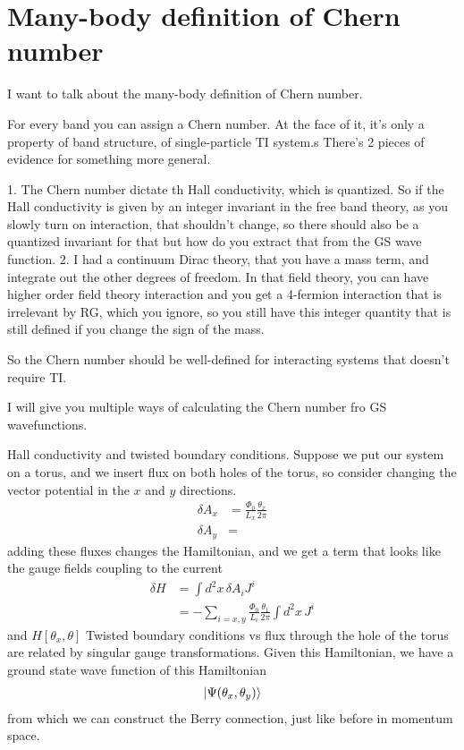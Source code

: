 \section{Many-body definition of Chern number}
I want to talk about the many-body definition of Chern number.

For every band you can assign a Chern number.
At the face of it,
it's only a property of band structure,
of single-particle TI system.s
There's 2 pieces of evidence for something more general.

1. The Chern number dictate th Hall conductivity,
which is quantized.
So if the Hall conductivity is given by an integer invariant in the free band
theory,
as you slowly turn on interaction,
that shouldn't change,
so there should also be a quantized invariant for that
but how do you extract that from the GS wave function.
2. I had a continuum Dirac theory,
that you have a mass term,
and integrate out the other degrees of freedom.
In that field theory,
you can have higher order field theory interaction
and you get a 4-fermion interaction that is irrelevant by RG,
which you ignore,
so you still have this integer quantity that is still defined if you change
the sign of the mass.

So the Chern number should be well-defined for interacting systems that doesn't
require TI.

I will give you multiple ways of calculating the Chern number fro GS
wavefunctions.


Hall conductivity and twisted boundary conditions.
Suppose we put our system on a torus,
and we insert flux on both holes of the torus,
so consider changing the vector potential in the $x$ and $y$ directions.
\begin{align}
    \delta A_x &=
    \frac{\Phi_0}{L_x} \frac{\theta_x}{2\pi}\\
    \delta A_y &= 
\end{align}
adding these fluxes changes the Hamiltonian,
and we get a term that looks like the gauge fields coupling to the current
\begin{align}
    \delta H &=
    \int d^2x \, \delta A_i J^i\\
    &=
    - \sum_{i=x,y} \frac{\Phi_0}{L_i} \frac{\theta_1}{2\pi}
    \int d^2 x\, J^i
\end{align}
and $H[\theta_x, \theta]$
Twisted boundary conditions vs flux through the hole of the torus are related by
singular gauge transformations.
Given this Hamiltonian,
we have a ground state wave function of this Hamiltonian
\begin{align}
    \ket{\Psi(\theta_x, \theta_y)}
\end{align}
from which we can construct the Berry connection,
just like before in momentum space.

